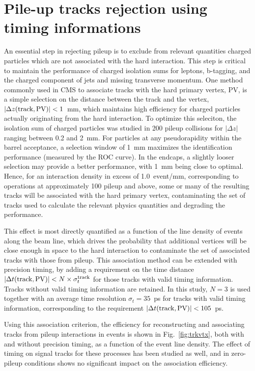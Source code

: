 \section{Pile-up tracks rejection using timing informations}
\label{sec:purej}
An essential step in rejecting pileup is to exclude from relevant
quantities charged particles which are not associated with the hard
interaction.  
This step is critical to maintain the performance of charged isolation
sums for leptons, b-tagging, and the charged component of jets and
missing transverse momentum.  
One method commonly used in CMS  to associate tracks with the hard
primary vertex, PV, is a simple selection on the distance between the
track and the vertex, $|\Delta
z(\textnormal{track},\textnormal{PV})|<1$~mm, which maintains 
high efficiency for charged particles actually originating from the
hard interaction. 
To optimize this seleciton, the isolation sum of charged
particles was studied in 200 pileup collisions for $|\Delta z|$
ranging between 0.2 and 2~mm. 
For particles at any pseudorapidity within the barrel acceptance, a
selection window of 1~mm maximizes the identification performance
(measured by the ROC curve).  
In the endcaps, a slightly looser selection may provide a better
performance, with 1~mm being close to optimal. 
Hence, for an interaction density in excess of 1.0~event/mm,
corresponding to operations at approximately 100 pileup and above,
some or many of the resulting tracks will be associated with the 
hard primary vertex, contaminating the set of tracks used to calculate
the relevant physics quantities and degrading the performance.

This effect is most directly quantified as a function of the line
density of events along the beam line, which drives the probability
that additional vertices will be close enough in space to the hard
interaction to contaminate the set of associated tracks with those
from pileup. 
This association method can be extended with precision timing, by
adding a requirement on the time distance $|\Delta
t(\textnormal{track},\textnormal{PV})|<N\times\sigma_t^{\textnormal{track}}$ for those tracks with valid timing information.  Tracks without valid timing information are retained.
In this study,  $N = 3$ is used together with an average time resolution $\sigma_t=35$~ps for tracks with valid timing information, corresponding to the requirement 
$|\Delta t(\textnormal{track},\textnormal{PV})|<105$~ps.

Using this association criterion, the efficiency for reconstructing and
associating tracks from pileup interactions in \ttbar events is
shown in Fig.~\ref{fig:trkvtx}, both with and without precision
timing, as a function of the event line density. The effect of timing
on signal tracks for these processes  has been studied as well, and in
zero-pileup conditions shows no significant impact on the association
efficiency. 

